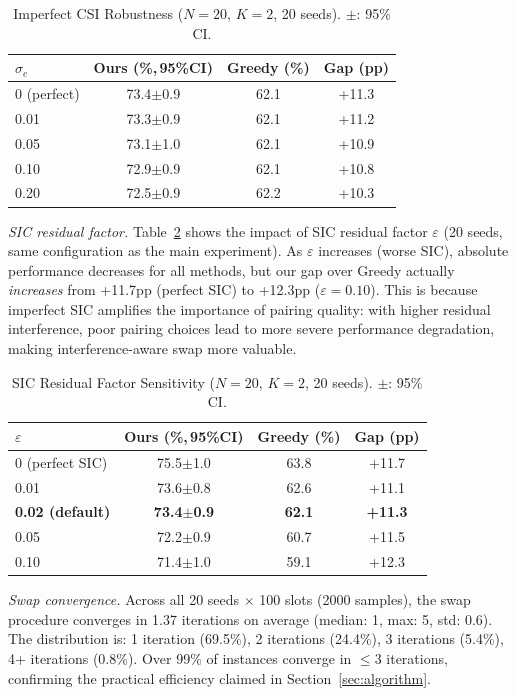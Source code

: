 \documentclass[journal]{IEEEtran}
\begin{document}
\begin{table}[t]
\centering
\caption{Imperfect CSI Robustness ($N=20$, $K=2$, 20 seeds). $\pm$: 95\% CI.}
\label{tab:csi}
\begin{tabular}{lccc}
\toprule
$\sigma_e$ & Ours (\%,\,95\%CI) & Greedy (\%) & Gap (pp) \\
\midrule
0 (perfect) & 73.4$\pm$0.9 & 62.1 & +11.3 \\
0.01 & 73.3$\pm$0.9 & 62.1 & +11.2 \\
0.05 & 73.1$\pm$1.0 & 62.1 & +10.9 \\
0.10 & 72.9$\pm$0.9 & 62.1 & +10.8 \\
0.20 & 72.5$\pm$0.9 & 62.2 & +10.3 \\
\bottomrule
\end{tabular}
\end{table}

\emph{SIC residual factor.}
Table~\ref{tab:sic} shows the impact of SIC residual factor $\varepsilon$ (20 seeds, same configuration as the main experiment).
As $\varepsilon$ increases (worse SIC), absolute performance decreases for all methods, but our gap over Greedy actually \emph{increases} from +11.7pp (perfect SIC) to +12.3pp ($\varepsilon=0.10$).
This is because imperfect SIC amplifies the importance of pairing quality: with higher residual interference, poor pairing choices lead to more severe performance degradation, making interference-aware swap more valuable.

\begin{table}[t]
\centering
\caption{SIC Residual Factor Sensitivity ($N=20$, $K=2$, 20 seeds). $\pm$: 95\% CI.}
\label{tab:sic}
\begin{tabular}{lccc}
\toprule
$\varepsilon$ & Ours (\%,\,95\%CI) & Greedy (\%) & Gap (pp) \\
\midrule
0 (perfect SIC) & 75.5$\pm$1.0 & 63.8 & +11.7 \\
0.01 & 73.6$\pm$0.8 & 62.6 & +11.1 \\
\textbf{0.02 (default)} & \textbf{73.4$\pm$0.9} & \textbf{62.1} & \textbf{+11.3} \\
0.05 & 72.2$\pm$0.9 & 60.7 & +11.5 \\
0.10 & 71.4$\pm$1.0 & 59.1 & +12.3 \\
\bottomrule
\end{tabular}
\end{table}

\emph{Swap convergence.}
Across all 20 seeds $\times$ 100 slots (2000 samples), the swap procedure converges in 1.37 iterations on average (median: 1, max: 5, std: 0.6).
The distribution is: 1 iteration (69.5\%), 2 iterations (24.4\%), 3 iterations (5.4\%), 4+ iterations (0.8\%).
Over 99\% of instances converge in $\leq$3 iterations, confirming the practical efficiency claimed in Section~\ref{sec:algorithm}.
\end{document}
